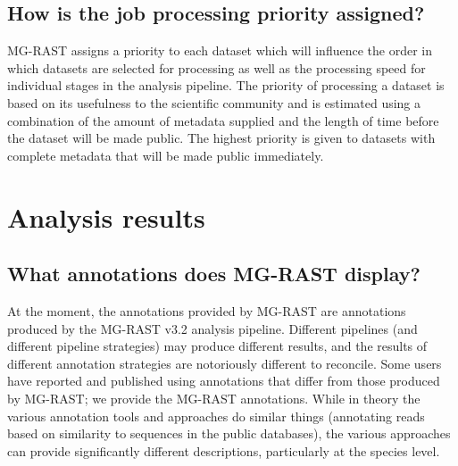 \documentclass[12pt,fullpage]{report}
\begin{document}
\subsection*{How is the job processing priority assigned?}
MG-RAST assigns a priority to each dataset which will influence the order in which datasets are selected for processing as well as the processing speed for individual stages in the analysis pipeline. The priority of processing a dataset is based on its usefulness to the scientific community and is estimated using a combination of the amount of metadata supplied and the length of time before the dataset will be made public. The highest priority is given to datasets with complete metadata that will be made public immediately.

\section{Analysis results}
\subsection*{What annotations does MG-RAST display?}
At the moment, the annotations provided by MG-RAST are annotations produced by the MG-RAST v3.2 analysis pipeline. Different pipelines (and different pipeline strategies) may produce different results, and the results of different annotation strategies are notoriously different to reconcile. Some users have reported and published using annotations that differ from those produced by MG-RAST; we provide the MG-RAST annotations. While in theory the various annotation tools and approaches do similar things (annotating reads based on similarity to sequences in the public databases), the various approaches can provide significantly different descriptions, particularly at the species level.
\end{document}
